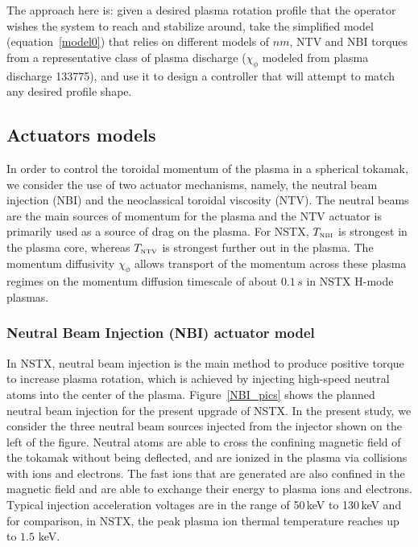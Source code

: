 \documentclass[12pt]{iopart}
\begin{document}
The approach here is: given a desired plasma rotation profile that the operator wishes the system to reach and stabilize around, take the simplified model (equation~\ref{model0}) that relies on different models of $ n  m$, NTV and NBI torques from a representative class of plasma discharge ($\chi_\phi$ modeled from plasma discharge 133775), and use it to design a controller that will attempt to match any desired profile shape.

\subsection{Actuators models}

In order to control the toroidal momentum of the plasma in a spherical tokamak, we consider the use of two actuator mechanisms, namely, the neutral beam injection (NBI) and the neoclassical toroidal viscosity (NTV). The neutral beams are the main sources of momentum for the plasma and the NTV actuator is primarily used as a source of drag on the plasma. For NSTX, $T_\textrm{\tiny NBI}$ is strongest  in the plasma core, whereas $T_\textrm{\tiny NTV}$ is strongest further out in the plasma. The momentum diffusivity $\chi_\phi$ allows transport of the momentum across these plasma regimes on the momentum diffusion timescale of about $0.1\,s$ in NSTX H-mode plasmas.


\subsubsection{Neutral Beam Injection (NBI) actuator model}
 \label{NBIAM}

In NSTX, neutral beam injection is the main method to produce positive torque to increase plasma rotation, which is achieved  by injecting high-speed neutral atoms into the center of the plasma. Figure~{\ref{NBI_pics}} shows the planned neutral beam injection for the present upgrade of NSTX. In the present study, we consider the three neutral beam sources injected from the injector shown on the left of the figure.
 Neutral atoms are able to cross the confining magnetic field of the tokamak without being deflected, and are ionized in the plasma via collisions with ions and electrons. The fast ions that are generated are also confined in the magnetic field and are able to exchange their energy to plasma ions and electrons. Typical injection acceleration voltages are in the range of 50\,keV to 130\,keV and for comparison, in NSTX, the peak plasma ion thermal temperature reaches up to $1.5$ keV.
\end{document}
